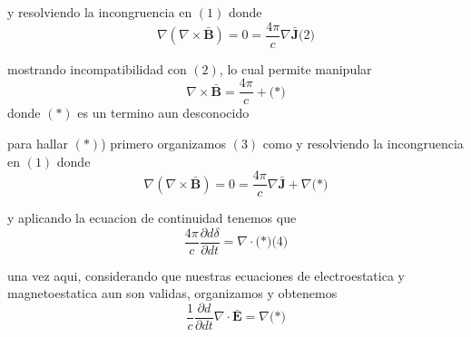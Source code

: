 \documentclass{article}
\begin{document}
	y resolviendo la incongruencia en \((1)\) donde
	\begin{equation*}
		\nabla(\nabla\times\mathbf{\bar{B}})=0=\frac{4\pi}{c}\nabla\mathbf{\bar{J}} \text{(2)}
	\end{equation*}
	
	mostrando incompatibilidad con \((2)\), lo cual permite manipular
	\begin{equation*}
			\nabla\times\mathbf{\bar{B}}=\frac{4\pi}{c} + \text{(*)}
	\end{equation*}
	donde \((*)\) es un termino aun desconocido
	
	para hallar \((*)\)) primero organizamos \((3)\) como 
	y resolviendo la incongruencia en \((1)\) donde
	\begin{equation*}
		\nabla(\nabla\times\mathbf{\bar{B}})=0=\frac{4\pi}{c} \nabla \mathbf{\bar{J}} + \nabla\text{(*)}
	\end{equation*}
	
	y aplicando la ecuacion de continuidad tenemos que 
	\begin{equation*}
		\frac{4\pi}{c} \frac{\partial d\delta}{\partial dt} = \nabla\cdot\text{(*)} \text{(4)}
	\end{equation*}
	
	una vez aqui, considerando que nuestras ecuaciones de electroestatica y magnetoestatica aun son validas, organizamos y obtenemos
	\begin{equation*}
		\frac{1}{c} \frac{\partial d}{\partial dt}\nabla \cdot \mathbf{\bar{E}}=\nabla \text{(*)}
	\end{equation*}
	
\end{document}
